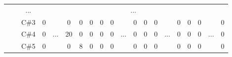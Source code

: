 \documentclass[12pt]{article}
\begin{document}
\begin{table}[!ht]
{\begin{tabular}{clcccccccccccccccccc}
                       & \multicolumn{1}{l|}{} & \multicolumn{1}{c|}{...}  & \multicolumn{17}{c|}{...}                                                                                                                                                                                                                                                                                                                                                                                                                                                                                                                       \\ \cline{3-4} \cline{6-10} \cline{12-14} \cline{16-18} \cline{20-20} 
                       & \multicolumn{1}{l|}{} & \multicolumn{1}{c|}{C\#3} & \multicolumn{1}{c|}{0}    & \multicolumn{1}{c|}{\multirow{5}{*}{...}} & \multicolumn{1}{c|}{0}    & \multicolumn{1}{c|}{0}    & \multicolumn{1}{c|}{0}    & \multicolumn{1}{c|}{0}    & \multicolumn{1}{c|}{0}  & \multicolumn{1}{c|}{\multirow{5}{*}{...}} & \multicolumn{1}{c|}{0}    & \multicolumn{1}{c|}{0}    & \multicolumn{1}{c|}{0}    & \multicolumn{1}{c|}{\multirow{5}{*}{...}} & \multicolumn{1}{c|}{0}  & \multicolumn{1}{c|}{0}  & \multicolumn{1}{c|}{0}  & \multicolumn{1}{c|}{\multirow{5}{*}{...}} & \multicolumn{1}{c|}{0}  \\ \cline{3-4} \cline{6-10} \cline{12-14} \cline{16-18} \cline{20-20} 
                       & \multicolumn{1}{l|}{} & \multicolumn{1}{c|}{C\#4} & \multicolumn{1}{c|}{0}    & \multicolumn{1}{c|}{}                     & \multicolumn{1}{c|}{20}   & \multicolumn{1}{c|}{0}    & \multicolumn{1}{c|}{0}    & \multicolumn{1}{c|}{0}    & \multicolumn{1}{c|}{0}  & \multicolumn{1}{c|}{}                     & \multicolumn{1}{c|}{0}    & \multicolumn{1}{c|}{0}    & \multicolumn{1}{c|}{0}    & \multicolumn{1}{c|}{}                     & \multicolumn{1}{c|}{0}  & \multicolumn{1}{c|}{0}  & \multicolumn{1}{c|}{0}  & \multicolumn{1}{c|}{}                     & \multicolumn{1}{c|}{0}  \\ \cline{3-4} \cline{6-10} \cline{12-14} \cline{16-18} \cline{20-20} 
                       & \multicolumn{1}{l|}{} & \multicolumn{1}{c|}{C\#5} & \multicolumn{1}{c|}{0}    & \multicolumn{1}{c|}{}                     & \multicolumn{1}{c|}{0}    & \multicolumn{1}{c|}{8}    & \multicolumn{1}{c|}{0}    & \multicolumn{1}{c|}{0}    & \multicolumn{1}{c|}{0}  & \multicolumn{1}{c|}{}                     & \multicolumn{1}{c|}{0}    & \multicolumn{1}{c|}{0}    & \multicolumn{1}{c|}{0}    & \multicolumn{1}{c|}{}                     & \multicolumn{1}{c|}{0}  & \multicolumn{1}{c|}{0}  & \multicolumn{1}{c|}{0}  & \multicolumn{1}{c|}{}                     & \multicolumn{1}{c|}{0}  \\ \cline{3-4} \cline{6-10} \cline{12-14} \cline{16-18} \cline{20-20} 

\end{tabular}}
\end{table}
\end{document}
